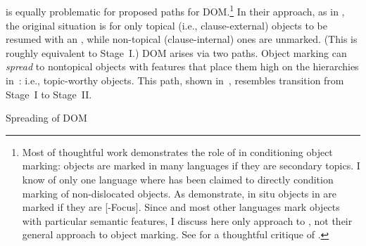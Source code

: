 \documentclass[output=paper]{LSP/langsci}
\begin{document}
\subsection{\citet{Dalrympleetal2011Objects}}
\label{Downing-Dalrymple}
 is equally problematic for
 proposed 
paths for DOM.\footnote{Most of \citet{Dalrympleetal2011Objects}
 thoughtful work demonstrates the role of  in
 conditioning object marking: objects are marked in many languages if
 they are secondary topics. I know of only one  language where
  has been claimed to directly condition marking
 of non-dislocated objects. As \citet{Baxetal2012Information}
 demonstrate, in situ objects in  are marked if they are
 [-Focus]. Since  and most other  languages mark objects
 with particular semantic features, I discuss here only
 approach to ,
 not their general approach to object marking. See
\citet{Iemmolo2013Symmetric,Iemmolo2014Differential} 
 for a thoughtful critique of .} In
their approach, as in , the original
situation is for only topical (i.e., clause-external) objects to be
resumed with an , while non-topical (clause-internal)
ones are unmarked. (This is roughly equivalent to
 Stage~I.) 
DOM arises via two paths. Object marking can
\textit{spread} to nontopical objects with features that place them
high on the hierarchies in~: i.e., topic-worthy
objects. This path, shown in~, resembles
 transition from Stage~I to Stage~II.

\largerpage
\begin{exe}
\ex
\label{02-do-ex:32}%
Spreading of DOM \citet[215]{Dalrympleetal2011Objects}\\

\end{exe}
\end{document}
